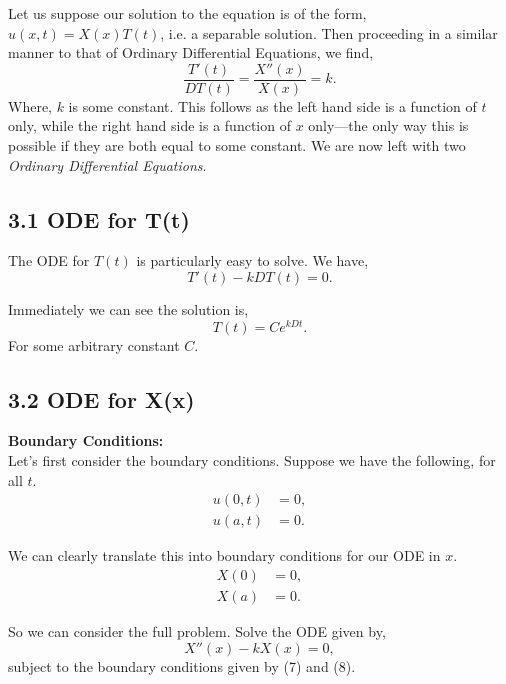\documentclass[11pt]{article}
\begin{document}
Let us suppose our solution to the equation is of the form, $u(x,t) = X(x)T(t)$, i.e. a separable solution. Then proceeding in a similar manner to that of Ordinary Differential Equations, we find,
\begin{equation}
    \frac{T'(t)}{DT(t)} = \frac{X''(x)}{X(x)} = k.
\end{equation}
Where, $k$ is some constant. This follows as the left hand side is a function of $t$ only, while the right hand side is a function of $x$ only––the only way this is possible if they are both equal to some constant. We are now left with two \textit{Ordinary Differential Equations}.

\newpage

\subsection*{3.1 ODE for T(t)}
The ODE for $T(t)$ is particularly easy to solve. We have,
\begin{equation}
    T'(t) - kDT(t) = 0. 
\end{equation}

Immediately we can see the solution is,
\begin{equation}
    T(t) = Ce^{kDt}.
\end{equation}
For some arbitrary constant $C$.

\subsection*{3.2 ODE for X(x)}

\textbf{Boundary Conditions:} \\
Let's first consider the boundary conditions. Suppose we have the following, for all $t$.
\begin{align}
    u(0,t) &= 0, \\ 
    u(a,t) &= 0.
\end{align}

We can clearly translate this into boundary conditions for our ODE in $x$.
\begin{align}
    X(0) &= 0, \\
    X(a) &= 0.
\end{align}

So we can consider the full problem. Solve the ODE given by,
\begin{equation}
    X''(x) - k X(x) = 0,
\end{equation}
subject to the boundary conditions given by (7) and (8).
\end{document}
